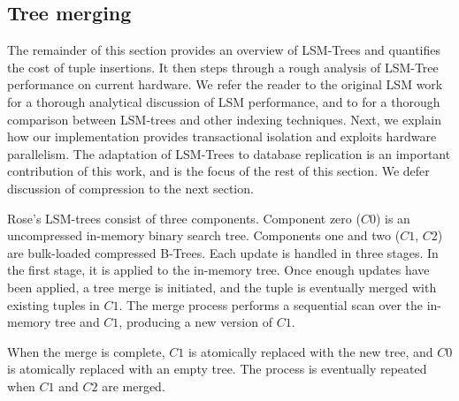 \documentclass{vldb}
\newcommand{\rows}{Rose\xspace}
\newcommand{\rowss}{Rose's\xspace}
\begin{document}


\subsection{Tree merging}

The remainder of this section provides an overview of LSM-Trees and quantifies the
cost of tuple insertions.  It then steps through a rough analysis of
LSM-Tree performance on current hardware.  We refer the reader to the
original LSM work for a thorough analytical discussion of LSM
performance, and to \cite{partitionedexponentialXXX} for a thorough
comparison between LSM-trees and other indexing techniques.  Next,
we explain how our implementation provides transactional isolation and
exploits hardware parallelism.  The adaptation of LSM-Trees to
database replication is an important contribution of this work, and is
the focus of the rest of this section.  We defer discussion of
compression to the next section.

\rowss LSM-trees consist of three components.  Component zero ($C0$)
is an uncompressed in-memory binary search tree.  Components one and two ($C1$,
$C2$) are bulk-loaded compressed B-Trees.
Each update is handled in three stages.  In the first stage,
it is applied to the in-memory tree.  Once enough updates
have been applied, a tree merge is initiated, and the tuple is
eventually merged with existing tuples in $C1$.  The merge process
performs a sequential scan over the in-memory tree and $C1$, producing
a new version of $C1$.

When the merge is complete, $C1$ is atomically replaced
with the new tree, and $C0$ is atomically replaced with an empty tree.
The process is eventually repeated when $C1$ and $C2$ are merged.
\end{document}
